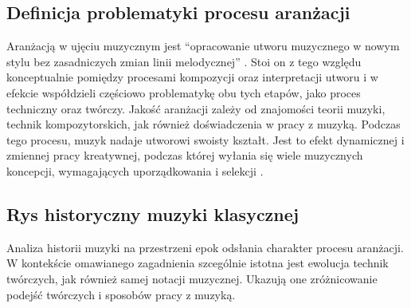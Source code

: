 \subsection{Definicja problematyki procesu aranżacji}
Aranżacją w ujęciu muzycznym jest
\enquote{opracowanie utworu muzycznego w nowym stylu bez zasadniczych zmian linii melodycznej} \cite{wsjp}.
Stoi on z tego względu konceptualnie pomiędzy procesami kompozycji oraz interpretacji utworu
i w efekcie współdzieli częściowo problematykę obu tych etapów, jako proces techniczny oraz twórczy.
Jakość aranżacji zależy od znajomości teorii muzyki, technik kompozytorskich, jak również doświadczenia w pracy z muzyką.
Podczas tego procesu, muzyk nadaje utworowi swoisty kształt. Jest to efekt dynamicznej i zmiennej pracy kreatywnej, podczas
której wyłania się wiele muzycznych koncepcji, wymagających uporządkowania i selekcji \cite{orchestration}.

\subsection{Rys historyczny muzyki klasycznej}
Analiza historii muzyki na przestrzeni epok odsłania charakter procesu aranżacji.
W kontekście omawianego zagadnienia szcególnie istotna jest ewolucja technik twórczych, jak również samej
notacji muzycznej. Ukazują one zróżnicowanie podejść twórczych i sposobów pracy z muzyką.

